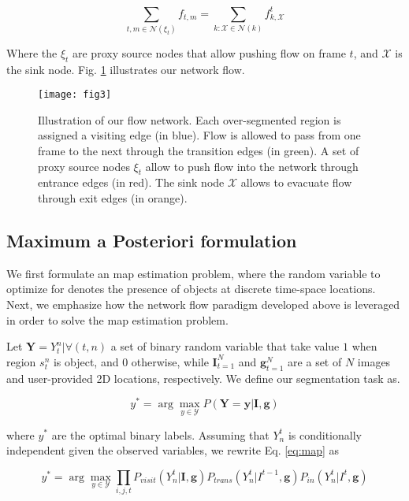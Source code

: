 \begin{equation}
  \label{eq:mass_constrain}
  \sum_{t,m\in \mathcal{N}(\xi_{t})}f_{t,m} = \sum_{k:\mathcal{X}\in\mathcal{N}(k)}f^{t}_{k,\mathcal{X}}
\end{equation}

Where the $\xi_{t}$ are proxy source nodes that allow pushing flow on frame $t$, and $\mathcal{X}$ is the sink node.
Fig. \ref{fig:flownetwork} illustrates our network flow.

\begin{figure}[!htpb]
  \centering
  \texttt{[image: fig3]}
  \caption{Illustration of our flow network. Each over-segmented region is assigned a visiting edge (in blue).
    Flow is allowed to pass from one frame to the next through the transition edges (in green).
    A set of proxy source nodes $\xi_{t}$ allow to push flow into the network through entrance edges (in red).
  The sink node $\mathcal{X}$ allows to evacuate flow through exit edges (in orange).}
  \label{fig:flownetwork}
\end{figure}

\subsection{Maximum a Posteriori formulation}
We first formulate an \gls{map} estimation problem, where the random variable to optimize for denotes the presence of objects at discrete time-space locations.
Next, we emphasize how the network flow paradigm developed above is leveraged in order to solve the \gls{map} estimation problem.

Let $\bm{Y}={Y^{n}_{t}|\forall(t,n)}$ a set of binary random variable that take value $1$ when region $s^{n}_{t}$ is object, and $0$ otherwise, while $\bm{I}_{t=1}^{N}$ and $\bm{g}_{t=1}^{N}$ are a set of $N$ images and user-provided 2D locations, respectively.
We define our segmentation task as.

\begin{equation}
  \label{eq:map}
  y^{*} = \arg \max_{y \in \mathcal{Y}}P(\bm{Y}=\bm{y}|\bm{I}, \bm{g})
\end{equation}

where $y^{*}$ are the optimal binary labels.
Assuming that $Y^{t}_{n}$ is conditionally independent given the observed variables, we rewrite Eq. \ref{eq:map} as

\begin{equation}
  \label{eq:bg_map2}
  y^{*} = \arg \max_{y \in \mathcal{Y}}\prod_{i,j,t} P_{visit}(Y^{t}_{n}|\bm{I}, \bm{g}) P_{trans}(Y^{t}_{n}|I^{t-1},\bm{g}) P_{in}(Y^{t}_{n}|I^{t},\bm{g})
\end{equation}

